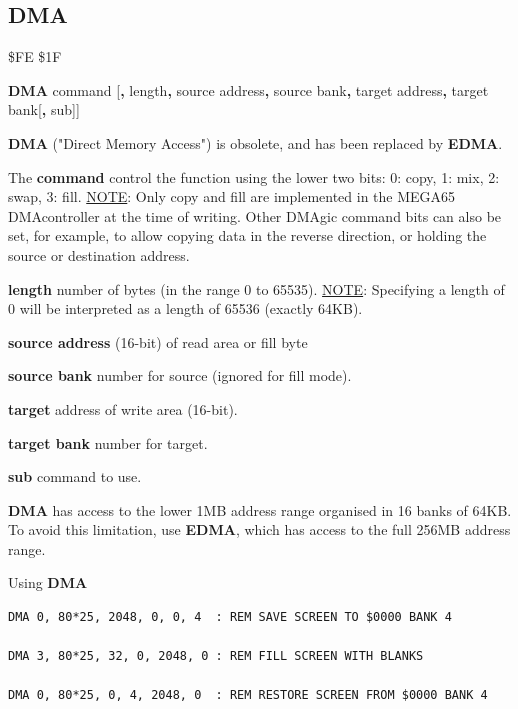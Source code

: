 \subsection{DMA}
\label{BASIC 65 Commands!DMA}
\begin{description}[leftmargin=2cm,style=nextline]
\item [Token:]    \$FE \$1F
\item [Format:]   {\bf DMA} command [{\bf,} length{\bf,} source address{\bf,} source bank{\bf,} target address{\bf,} target bank[{\bf,} sub]]
\item [Usage:]    {\bf DMA} ("Direct Memory Access") is obsolete, and has been replaced by {\bf EDMA}.

                  The {\bf command} control the function using the lower two bits: 0: copy, 1: mix, 2: swap, 3: fill. \underline{NOTE}: Only copy and fill are implemented in the MEGA65 DMAcontroller at the time of writing. Other DMAgic command bits can also be set, for example, to allow copying data in the reverse direction, or holding the source or destination address.

                  {\bf length} number of bytes (in the range 0 to 65535). \underline{NOTE}: Specifying a length of 0 will be interpreted as a length of 65536 (exactly 64KB).

                  {\bf source address} (16-bit) of read area or fill byte

                  {\bf source bank} number for source (ignored for fill mode).

                  {\bf target} address of write area (16-bit).

                  {\bf target bank} number for target.

                  {\bf sub} command to use.

\item [Remarks:]  {\bf DMA} has access to the lower 1MB address range organised in 16 banks of 64KB. To avoid this limitation, use {\bf EDMA}, which has access to the full 256MB address range.

\item [Examples:] Using {\bf DMA}

\begin{tcolorbox}[colback=black,coltext=white]
\verbatimfont{\codefont}
\begin{verbatim}
DMA 0, 80*25, 2048, 0, 0, 4  : REM SAVE SCREEN TO $0000 BANK 4

DMA 3, 80*25, 32, 0, 2048, 0 : REM FILL SCREEN WITH BLANKS

DMA 0, 80*25, 0, 4, 2048, 0  : REM RESTORE SCREEN FROM $0000 BANK 4
\end{verbatim}
\end{tcolorbox}
\end{description}

